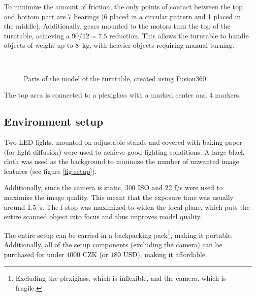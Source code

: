 To minimize the amount of friction, the only points of contact between the top and bottom part are 7 bearings (6 placed in a circular pattern and 1 placed in the middle).
Additionally, gears mounted to the motors turn the top of the turntable, achieving a $90/12 = 7.5$ reduction.
This allows the turntable to handle objects of weight up to \SI{8}{\kilo\gram}, with heavier objects requiring manual turning.

\begin{figure}
	\centering
	\hfill
	\hfill
	\\
	\qquad
	\qquad
	\hfill
	\hfill
	\qquad
	\qquad
	\quad
	\qquad
	\caption{Parts of the model of the turntable, created using Fusion360.}%
	\label{fig:turntable}
\end{figure}

The top area is connected to a plexiglass with a marked center and 4 markers.

\subsection{Environment setup}
Two LED lights, mounted on adjustable stands and covered with baking paper (for light diffusion) were used to achieve good lighting conditions.
A large black cloth was used as the background to minimize the number of unwanted image features (see figure \ref{fig:setup}).

Additionally, since the camera is static, 300 ISO and 22 f/s were used to maximize the image quality.
This meant that the exposure time was usually around \SI{1.5}{\second}.
The f-stop was maximized to widen the focal plane, which puts the entire scanned object into focus and thus improves model quality.

The entire setup can be carried in a backpacking pack\footnote{Excluding the plexiglass, which is inflexible, and the camera, which is fragile.}, making it portable.
Additionally, all of the setup components (excluding the camera) can be purchased for under $4000$ CZK (or $180$ USD), making it affordable.


